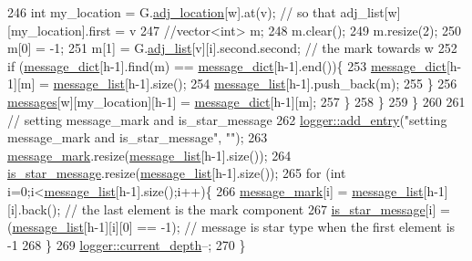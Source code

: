\begin{DoxyCode}
246         \textcolor{keywordtype}{int} my\_location = G.\hyperlink{classmarked__graph_a3ae722ea9583ad23af34d789a88ac01a}{adj\_location}[w].at(v); \textcolor{comment}{// so that adj\_list[w][my\_location].first =
       v}
247         \textcolor{comment}{//vector<int> m;}
248         m.clear();
249         m.resize(2);
250         m[0] = -1;
251         m[1] = G.\hyperlink{classmarked__graph_a1a0bf7ca413a278763f7c878b3b6fd6f}{adj\_list}[v][i].second.second; \textcolor{comment}{// the mark towards w}
252         \textcolor{keywordflow}{if} (\hyperlink{classgraph__message_ab54d89b122c2b1322da0d5db2043fb84}{message\_dict}[h-1].find(m) == \hyperlink{classgraph__message_ab54d89b122c2b1322da0d5db2043fb84}{message\_dict}[h-1].end())\{
253           \hyperlink{classgraph__message_ab54d89b122c2b1322da0d5db2043fb84}{message\_dict}[h-1][m] = \hyperlink{classgraph__message_aa17fdb629b423343edfafa97252763ef}{message\_list}[h-1].size();
254           \hyperlink{classgraph__message_aa17fdb629b423343edfafa97252763ef}{message\_list}[h-1].push\_back(m);
255         \}
256         \hyperlink{classgraph__message_aac77e098f0acf9650116a8e51fe3b4b7}{messages}[w][my\_location][h-1] = \hyperlink{classgraph__message_ab54d89b122c2b1322da0d5db2043fb84}{message\_dict}[h-1][m];
257       \}
258     \}
259   \}
260 
261   \textcolor{comment}{// setting message\_mark and is\_star\_message}
262   \hyperlink{classlogger_a710163deb17bc81f70d53d285b8ac9ac}{logger::add\_entry}(\textcolor{stringliteral}{"setting message\_mark and is\_star\_message"}, \textcolor{stringliteral}{""});
263   \hyperlink{classgraph__message_a49d9af5150daf0599c29fe18cb032fa5}{message\_mark}.resize(\hyperlink{classgraph__message_aa17fdb629b423343edfafa97252763ef}{message\_list}[h-1].size());
264   \hyperlink{classgraph__message_a55ff5531a0043106369e84a7bc45e22d}{is\_star\_message}.resize(\hyperlink{classgraph__message_aa17fdb629b423343edfafa97252763ef}{message\_list}[h-1].size());
265   \textcolor{keywordflow}{for} (\textcolor{keywordtype}{int} i=0;i<\hyperlink{classgraph__message_aa17fdb629b423343edfafa97252763ef}{message\_list}[h-1].size();i++)\{
266     \hyperlink{classgraph__message_a49d9af5150daf0599c29fe18cb032fa5}{message\_mark}[i] = \hyperlink{classgraph__message_aa17fdb629b423343edfafa97252763ef}{message\_list}[h-1][i].back(); \textcolor{comment}{// the last element is the mark
       component}
267     \hyperlink{classgraph__message_a55ff5531a0043106369e84a7bc45e22d}{is\_star\_message}[i] = (\hyperlink{classgraph__message_aa17fdb629b423343edfafa97252763ef}{message\_list}[h-1][i][0] == -1); \textcolor{comment}{// message is star
       type when the first element is -1}
268   \}
269   \hyperlink{classlogger_a9d29b49bd318a719a8e85b59eac54fe0}{logger::current\_depth}--;
270 \}
\end{DoxyCode}


